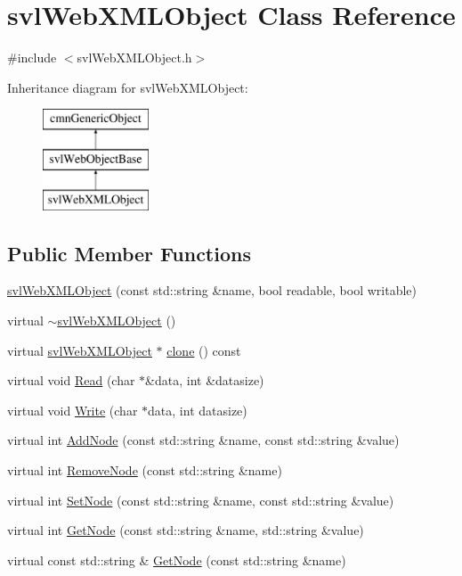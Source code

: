 \hypertarget{classsvl_web_x_m_l_object}{}\section{svl\+Web\+X\+M\+L\+Object Class Reference}
\label{classsvl_web_x_m_l_object}


{\ttfamily \#include $<$svl\+Web\+X\+M\+L\+Object.\+h$>$}

Inheritance diagram for svl\+Web\+X\+M\+L\+Object\+:\begin{figure}[H]
\begin{center}
\leavevmode
\includegraphics[height=3.000000cm]{d9/d00/classsvl_web_x_m_l_object}
\end{center}
\end{figure}
\subsection*{Public Member Functions}
\begin{DoxyCompactItemize}
\item 
\hyperlink{classsvl_web_x_m_l_object_a6471e4cce2cddbaf7c68be312802814d}{svl\+Web\+X\+M\+L\+Object} (const std\+::string \&name, bool readable, bool writable)
\item 
virtual \hyperlink{classsvl_web_x_m_l_object_a030c007780e418b414bd369ec29168b0}{$\sim$svl\+Web\+X\+M\+L\+Object} ()
\item 
virtual \hyperlink{classsvl_web_x_m_l_object}{svl\+Web\+X\+M\+L\+Object} $\ast$ \hyperlink{classsvl_web_x_m_l_object_ae51b3264a837a7cae855cf8b12fa19a4}{clone} () const 
\item 
virtual void \hyperlink{classsvl_web_x_m_l_object_a3136311431e9ba3ab635c34af4efd81b}{Read} (char $\ast$\&data, int \&datasize)
\item 
virtual void \hyperlink{classsvl_web_x_m_l_object_a7117639987748c075a48fe1c9827f2cb}{Write} (char $\ast$data, int datasize)
\item 
virtual int \hyperlink{classsvl_web_x_m_l_object_abf7ad11eb2ce3e8e3861b697f859cd60}{Add\+Node} (const std\+::string \&name, const std\+::string \&value)
\item 
virtual int \hyperlink{classsvl_web_x_m_l_object_a7341c249a6e76a841e938fb3ab20ef65}{Remove\+Node} (const std\+::string \&name)
\item 
virtual int \hyperlink{classsvl_web_x_m_l_object_a0b9007c3bf7fbea492df3887f2a95363}{Set\+Node} (const std\+::string \&name, const std\+::string \&value)
\item 
virtual int \hyperlink{classsvl_web_x_m_l_object_aec17cc310165cfbeb52aada2a322a5f8}{Get\+Node} (const std\+::string \&name, std\+::string \&value)
\item 
virtual const std\+::string \& \hyperlink{classsvl_web_x_m_l_object_afacc8ffab951c7304953f195c6ebb743}{Get\+Node} (const std\+::string \&name)
\end{DoxyCompactItemize}
